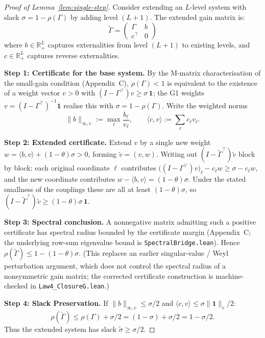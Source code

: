 \documentclass[12pt]{article}
\newcommand{\R}{\mathbb{R}}
\begin{document}
\begin{proof}[Proof of Lemma~\ref{lem:single-step}]
Consider extending an $L$-level system with slack $\sigma = 1 - \rho(\Gamma)$ by adding level $(L+1)$. The extended gain matrix is:
\[
\tilde{\Gamma} = \begin{pmatrix} \Gamma & b \\ c^\top & 0 \end{pmatrix}
\]
where $b \in \R^L_+$ captures externalities from level $(L+1)$ to existing levels, and $c \in \R^L_+$ captures reverse externalities.

\textbf{Step 1: Certificate for the base system.}
By the M-matrix characterisation of the small-gain condition (Appendix~C), $\rho(\Gamma) < 1$ is equivalent to the existence of a weight vector $v > 0$ with $(I - \Gamma^\top)v \geq \sigma\,\mathbf{1}$; the G1 weights $v = (I - \Gamma^\top)^{-1}\mathbf{1}$ realise this with $\sigma = 1 - \rho(\Gamma)$. Write the weighted norms
\[
\|b\|_{\infty, v} := \max_\ell \frac{b_\ell}{v_\ell}, \qquad \langle c, v \rangle := \sum_\ell c_\ell v_\ell.
\]

\textbf{Step 2: Extended certificate.}
Extend $v$ by a single new weight $w = \langle b, v\rangle + (1-\theta)\sigma > 0$, forming $\tilde{v} = (v, w)$. Writing out $(I - \tilde{\Gamma}^\top)\tilde{v}$ block by block: each original coordinate $\ell$ contributes $\big((I - \Gamma^\top)v\big)_\ell - c_\ell w \geq \sigma - c_\ell w$, and the new coordinate contributes $w - \langle b, v\rangle = (1-\theta)\sigma$. Under the stated smallness of the couplings these are all at least $(1-\theta)\sigma$, so $(I - \tilde{\Gamma}^\top)\tilde{v} \geq (1-\theta)\sigma\,\mathbf{1}$.

\textbf{Step 3: Spectral conclusion.}
A nonnegative matrix admitting such a positive certificate has spectral radius bounded by the certificate margin (Appendix~C; the underlying row-sum eigenvalue bound is \texttt{SpectralBridge.lean}). Hence $\rho(\tilde{\Gamma}) \leq 1 - (1-\theta)\sigma$. (This replaces an earlier singular-value / Weyl perturbation argument, which does not control the spectral radius of a nonsymmetric gain matrix; the corrected certificate construction is machine-checked in \texttt{Law4\_ClosureG.lean}.)

\textbf{Step 4: Slack Preservation.}
If $\|b\|_{\infty, v} \leq \sigma/2$ and $\langle c, v \rangle \leq \sigma \|\mathbf{1}\|_v / 2$:
\[
\rho(\tilde{\Gamma}) \leq \rho(\Gamma) + \sigma/2 = (1 - \sigma) + \sigma/2 = 1 - \sigma/2.
\]
Thus the extended system has slack $\tilde{\sigma} \geq \sigma/2$.
\end{proof}
\end{document}
